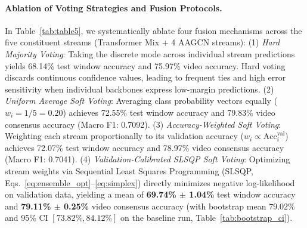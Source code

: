 \documentclass[runningheads]{llncs}
\begin{document}
\paragraph{Ablation of Voting Strategies and Fusion Protocols.} In Table~\ref{tab:table5}, we systematically ablate four fusion mechanisms across the five constituent streams (Transformer Mix + 4 AAGCN streams):
(1) \textit{Hard Majority Voting}: Taking the discrete mode across individual stream predictions yields 68.14\% test window accuracy and 75.97\% video accuracy. Hard voting discards continuous confidence values, leading to frequent ties and high error sensitivity when individual backbones express low-margin predictions.
(2) \textit{Uniform Average Soft Voting}: Averaging class probability vectors equally ($w_i = 1/5 = 0.20$) achieves 72.55\% test window accuracy and 79.83\% video consensus accuracy (Macro F1: 0.7092).
(3) \textit{Accuracy-Weighted Soft Voting}: Weighting each stream proportionally to its validation accuracy ($w_i \propto \text{Acc}_i^{\text{val}}$) achieves 72.07\% test window accuracy and 78.97\% video consensus accuracy (Macro F1: 0.7041).
(4) \textit{Validation-Calibrated SLSQP Soft Voting}: Optimizing stream weights via Sequential Least Squares Programming (SLSQP, Eqs.~\eqref{eq:ensemble_opt}--\eqref{eq:simplex}) directly minimizes negative log-likelihood on validation data, yielding a mean of \textbf{69.74\% $\pm$ 1.04\%} test window accuracy and \textbf{79.11\% $\pm$ 0.25\%} video consensus accuracy (with bootstrap mean $79.02\%$ and 95\% CI $[73.82\%, 84.12\%]$ on the baseline run, Table~\ref{tab:bootstrap_ci}).
\end{document}

